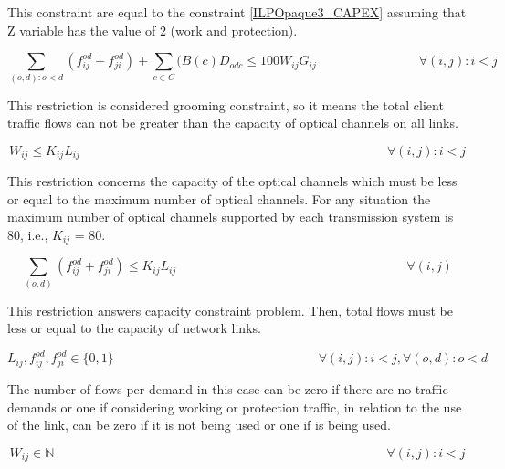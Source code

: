 This constraint are equal to the constraint \ref{ILPOpaque3_CAPEX} assuming that Z variable has the value of 2 (work and protection).

\begin{equation}
\sum_{(o,d):o<d} \left(f_{ij}^{od} + f_{ji}^{od}\right) + \sum_{c\in C} (B\left(c\right) D_{odc}\leq100 W_{ij} G_{ij} \qquad \qquad \qquad \qquad
\forall(i,j) : i < j
\label{ILPOpaque4}
\end{equation}

This restriction is considered grooming constraint, so it means the total client traffic flows can not be greater than the capacity of optical channels on all links.

\begin{equation}
W_{ij} \leq K_{ij} L_{ij} \qquad \qquad \qquad \qquad \qquad \qquad \qquad \qquad \qquad \qquad \qquad \qquad \forall(i,j) : i < j
\label{ILPOpaque5}
\end{equation}

This restriction concerns the capacity of the optical channels which must be less or equal to the maximum number of optical channels. For any situation the maximum number of optical channels supported by each transmission system is 80, i.e., $K_{ij}$ = 80.

\begin{equation}
\sum_{(o,d)} \left(f_{ij}^{od} + f_{ji}^{od}\right)\leq K_{ij} L_{ij} \qquad \qquad \qquad \qquad \qquad \qquad \qquad \qquad \qquad
\forall (i,j)
\label{ILPOpaqueX}
\end{equation}

This restriction answers capacity constraint problem. Then, total flows must be less or equal to the capacity of network links.

\begin{equation}
L_{ij} , f_{ij}^{od} , f_{ji}^{od} \in \{0,1\}   \qquad \qquad \qquad \qquad \qquad \qquad \qquad \qquad
\forall(i,j) : i < j, \forall(o,d) : o < d
\label{ILPOpaque6}
\end{equation}

The number of flows per demand in this case can be zero if there are no traffic demands or one if considering working or protection traffic, in relation to the use of the link, can be zero if it is not being used or one if is being used.

\begin{equation}
W_{ij} \in \mathbb{N}  \qquad \qquad \qquad \qquad \qquad \qquad \qquad \qquad \qquad \qquad \qquad \qquad \qquad
\forall(i,j) : i < j\label{ILPOpaque7}
\end{equation}

